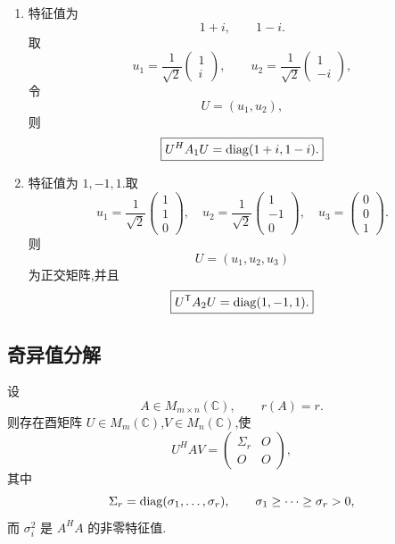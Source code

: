 \begin{solution}
\leavevmode
\begin{enumerate}
    \item 特征值为
    \[
    1+i,\qquad 1-i.
    \]
    取
    \[
    u_1=
    \dfrac1{\sqrt2}
    \begin{pmatrix}1\\i\end{pmatrix},
    \qquad
    u_2=
    \dfrac1{\sqrt2}
    \begin{pmatrix}1\\-i\end{pmatrix},
    \]
    令
    \[
    U=(u_1,u_2),
    \]
    则
    \[
    \boxed{
    U^HA_1U
    =
    \operatorname{diag}(1+i,1-i).
    }
    \]

    \item 特征值为 $1,-1,1$.取
    \[
    u_1=
    \dfrac1{\sqrt2}
    \begin{pmatrix}1\\1\\0\end{pmatrix},
    \quad
    u_2=
    \dfrac1{\sqrt2}
    \begin{pmatrix}1\\-1\\0\end{pmatrix},
    \quad
    u_3=
    \begin{pmatrix}0\\0\\1\end{pmatrix}.
    \]
    则
    \[
    U=(u_1,u_2,u_3)
    \]
    为正交矩阵,并且
    \[
    \boxed{
    U^{\mathsf T}A_2U=\operatorname{diag}(1,-1,1).
    }
    \]
\end{enumerate}
\end{solution}


\subsection{奇异值分解}

\begin{theorem}[\markstar]
设
\[
A\in M_{m\times n}(\mathbb{C}),
\qquad
r(A)=r.
\]
则存在酉矩阵 $U\in M_m(\mathbb{C})$,$V\in M_n(\mathbb{C})$,使
\[
U^HAV
=
\begin{pmatrix}
\Sigma_r&O\\
O&O
\end{pmatrix},
\]
其中
\[
\Sigma_r=\operatorname{diag}(\sigma_1,\ldots,\sigma_r),
\qquad
\sigma_1\ge\cdots\ge\sigma_r>0,
\]
而 $\sigma_i^2$ 是 $A^HA$ 的非零特征值.
\end{theorem}


